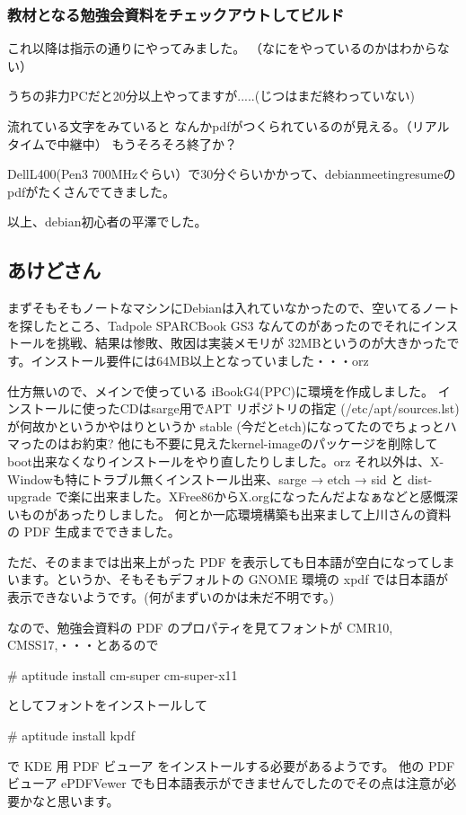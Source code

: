 \documentclass[mingoth,a4paper]{jsarticle}
\begin{document}
\subsubsection{教材となる勉強会資料をチェックアウトしてビルド}

これ以降は指示の通りにやってみました。
（なにをやっているのかはわからない）

うちの非力PCだと20分以上やってますが.....(じつはまだ終わっていない)

流れている文字をみていると
なんかpdfがつくられているのが見える。（リアルタイムで中継中）
もうそろそろ終了か？

DellL400(Pen3 700MHzぐらい）で30分ぐらいかかって、debianmeetingresumeの
pdfがたくさんでてきました。

以上、debian初心者の平澤でした。

\subsection{あけどさん}

まずそもそもノートなマシンにDebianは入れていなかったので、空いてるノートを探したところ、Tadpole SPARCBook GS3
なんてのがあったのでそれにインストールを挑戦、結果は惨敗、敗因は実装メモリが
32MBというのが大きかったです。インストール要件には64MB以上となっていました・・・orz

仕方無いので、メインで使っている iBookG4(PPC)に環境を作成しました。
インストールに使ったCDはsarge用でAPT リポジトリの指定 (/etc/apt/sources.lst)
が何故かというかやはりというか stable (今だとetch)になってたのでちょっとハマったのはお約束?
他にも不要に見えたkernel-imageのパッケージを削除してboot出来なくなりインストールをやり直したりしました。orz
それ以外は、X-Windowも特にトラブル無くインストール出来、sarge → etch → sid と dist-upgrade
で楽に出来ました。XFree86からX.orgになったんだよなぁなどと感慨深いものがあったりしました。
何とか一応環境構築も出来まして上川さんの資料の PDF 生成までできました。

 ただ、そのままでは出来上がった PDF を表示しても日本語が空白になってしまいます。というか、そもそもデフォルトの GNOME 環境の
xpdf では日本語が表示できないようです。(何がまずいのかは未だ不明です。)

 なので、勉強会資料の PDF のプロパティを見てフォントが CMR10, CMSS17,・・・とあるので
\begin{commandline}
   # aptitude install cm-super cm-super-x11
\end{commandline}
としてフォントをインストールして
\begin{commandline}
   # aptitude install kpdf
\end{commandline}
で KDE 用 PDF ビューア をインストールする必要があるようです。
 他の PDF ビューア ePDFVewer でも日本語表示ができませんでしたのでその点は注意が必要かなと思います。
\end{document}
